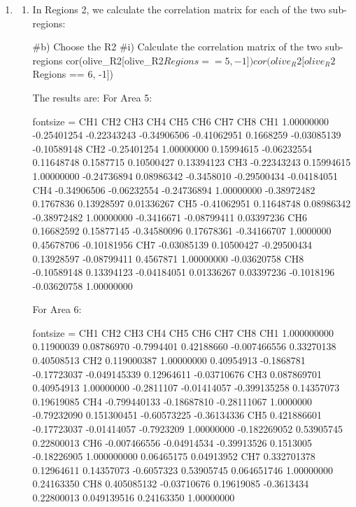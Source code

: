 \documentclass{article}
\begin{document}
\begin{enumerate}[leftmargin = 0 em, label = \arabic*., font = \bfseries]
\begin{enumerate}
	\item 
	\begin{enumerate}
		\item 
	In Regions 2, we calculate the correlation matrix for each of the two sub-regions:
	\begin{rcode}
#b) Choose the R2
#i) Calculate the correlation matrix of the two sub-regions
cor(olive_R2[olive_R2$Regions == 5, -1])
cor(olive_R2[olive_R2$Regions == 6, -1])
	\end{rcode}
	The results are:
	For Area 5:
	\begin{rcode*}{fontsize = \tiny}
            CH1         CH2         CH3         CH4         CH5        CH6         CH7         CH8
CH1  1.00000000 -0.25401254 -0.22343243 -0.34906506 -0.41062951  0.1668259 -0.03085139 -0.10589148
CH2 -0.25401254  1.00000000  0.15994615 -0.06232554  0.11648748  0.1587715  0.10500427  0.13394123
CH3 -0.22343243  0.15994615  1.00000000 -0.24736894  0.08986342 -0.3458010 -0.29500434 -0.04184051
CH4 -0.34906506 -0.06232554 -0.24736894  1.00000000 -0.38972482  0.1767836  0.13928597  0.01336267
CH5 -0.41062951  0.11648748  0.08986342 -0.38972482  1.00000000 -0.3416671 -0.08799411  0.03397236
CH6  0.16682592  0.15877145 -0.34580096  0.17678361 -0.34166707  1.0000000  0.45678706 -0.10181956
CH7 -0.03085139  0.10500427 -0.29500434  0.13928597 -0.08799411  0.4567871  1.00000000 -0.03620758
CH8 -0.10589148  0.13394123 -0.04184051  0.01336267  0.03397236 -0.1018196 -0.03620758  1.00000000
	\end{rcode*}
	For Area 6:
	\begin{rcode*}{fontsize = \tiny}
             CH1         CH2         CH3        CH4         CH5          CH6         CH7         CH8
CH1  1.000000000  0.11900039  0.08786970 -0.7994401  0.42188660 -0.007466556  0.33270138  0.40508513
CH2  0.119000387  1.00000000  0.40954913 -0.1868781 -0.17723037 -0.049145339  0.12964611 -0.03710676
CH3  0.087869701  0.40954913  1.00000000 -0.2811107 -0.01414057 -0.399135258  0.14357073  0.19619085
CH4 -0.799440133 -0.18687810 -0.28111067  1.0000000 -0.79232090  0.151300451 -0.60573225 -0.36134336
CH5  0.421886601 -0.17723037 -0.01414057 -0.7923209  1.00000000 -0.182269052  0.53905745  0.22800013
CH6 -0.007466556 -0.04914534 -0.39913526  0.1513005 -0.18226905  1.000000000  0.06465175  0.04913952
CH7  0.332701378  0.12964611  0.14357073 -0.6057323  0.53905745  0.064651746  1.00000000  0.24163350
CH8  0.405085132 -0.03710676  0.19619085 -0.3613434  0.22800013  0.049139516  0.24163350  1.00000000
	\end{rcode*}

\end{enumerate}
\end{enumerate}
\end{enumerate}
\end{document}
